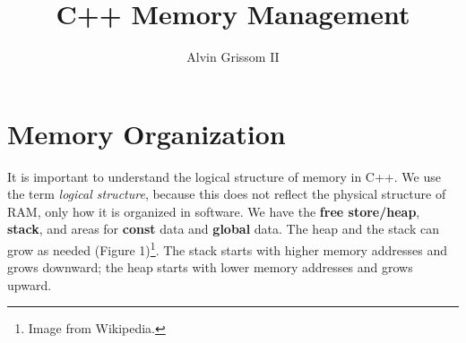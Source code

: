 \documentclass[12pt]{article}
\title{C++ Memory Management}
\author{Alvin Grissom II}
\begin{document}
\maketitle
\section{Memory Organization}

It is important to understand the logical structure of memory in C++.
We use the term \textit{logical structure}, because this does not
reflect the physical structure of RAM, only how it is organized in
software.  We have the \textbf{free store/heap}, \textbf{stack}, and
areas for \textbf{const} data and \textbf{global} data.  The heap and
the stack can grow as needed (Figure 1)\footnote{Image from
  Wikipedia.}.  The stack starts with higher memory addresses and
grows downward; the heap starts with lower memory addresses and grows
upward.
\end{document}
